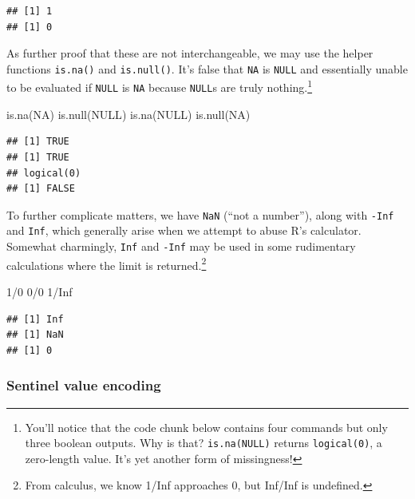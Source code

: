 \documentclass[
]{krantz}
\makeatletter
\newenvironment{Shaded}{\begin{snugshade}}{\end{snugshade}}
\newcommand{\ConstantTok}[1]{\textcolor[rgb]{0,0,0}{#1}}
\newcommand{\DecValTok}[1]{\textcolor[rgb]{0.06,0.06,0.06}{#1}}
\newcommand{\FunctionTok}[1]{\textcolor[rgb]{0,0,0}{#1}}
\newcommand{\NormalTok}[1]{#1}
\newcommand{\SpecialCharTok}[1]{\textcolor[rgb]{0,0,0}{#1}}
\newenvironment{kframe}{%
\medskip{}
\setlength{\fboxsep}{.8em}
 \def\at@end@of@kframe{}%
 \ifinner\ifhmode%
  \def\at@end@of@kframe{\end{minipage}}%
  \begin{minipage}{\columnwidth}%
 \fi\fi%
 \def\FrameCommand##1{\hskip\@totalleftmargin \hskip-\fboxsep
 \colorbox{shadecolor}{##1}\hskip-\fboxsep
     \hskip-\linewidth \hskip-\@totalleftmargin \hskip\columnwidth}%
 \MakeFramed {\advance\hsize-\width
   \@totalleftmargin\z@ \linewidth\hsize
   \@setminipage}}%
 {\par\unskip\endMakeFramed%
 \at@end@of@kframe}
\renewenvironment{Shaded}{\begin{kframe}}{\end{kframe}}
\makeatother
\begin{document}
\begin{verbatim}
## [1] 1
## [1] 0
\end{verbatim}

As further proof that these are not interchangeable, we may use the helper functions \texttt{is.na()} and \texttt{is.null()}. It's false that \texttt{NA} is \texttt{NULL} and essentially unable to be evaluated if \texttt{NULL} is \texttt{NA} because \texttt{NULL}s are truly nothing.\footnote{You'll notice that the code chunk below contains four commands but only three boolean outputs. Why is that? \texttt{is.na(NULL)} returns \texttt{logical(0)}, a zero-length value. It's yet another form of missingness!}

\begin{Shaded}
\begin{Highlighting}[]
\FunctionTok{is.na}\NormalTok{(}\ConstantTok{NA}\NormalTok{)}
\FunctionTok{is.null}\NormalTok{(}\ConstantTok{NULL}\NormalTok{)}
\FunctionTok{is.na}\NormalTok{(}\ConstantTok{NULL}\NormalTok{)}
\FunctionTok{is.null}\NormalTok{(}\ConstantTok{NA}\NormalTok{)}
\end{Highlighting}
\end{Shaded}

\begin{verbatim}
## [1] TRUE
## [1] TRUE
## logical(0)
## [1] FALSE
\end{verbatim}

To further complicate matters, we have \texttt{NaN} (``not a number''), along with \texttt{-Inf} and \texttt{Inf}, which generally arise when we attempt to abuse R's calculator. Somewhat charmingly, \texttt{Inf} and \texttt{-Inf} may be used in some rudimentary calculations where the limit is returned.\footnote{From calculus, we know 1/Inf approaches 0, but Inf/Inf is undefined.}

\begin{Shaded}
\begin{Highlighting}[]
\DecValTok{1}\SpecialCharTok{/}\DecValTok{0}
\DecValTok{0}\SpecialCharTok{/}\DecValTok{0}
\DecValTok{1}\SpecialCharTok{/}\ConstantTok{Inf}
\end{Highlighting}
\end{Shaded}

\begin{verbatim}
## [1] Inf
## [1] NaN
## [1] 0
\end{verbatim}

\hypertarget{sentinel-value-encoding}{%
\subsubsection{Sentinel value encoding}\label{sentinel-value-encoding}}
\end{document}
